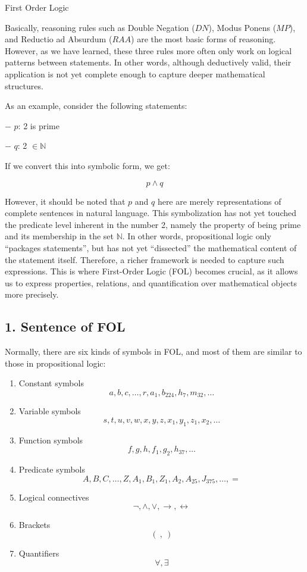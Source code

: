 First Order Logic

Basically, reasoning rules such as Double Negation (\(DN\)), Modus
Ponens (\(MP\)), and Reductio ad Absurdum (\(RAA\)) are the most basic
forms of reasoning. However, as we have learned, these three rules more
often only work on logical patterns between statements. In other words,
although deductively valid, their application is not yet complete enough
to capture deeper mathematical structures.

As an example, consider the following statements:

− \(p\): 2 is prime

− \(q\): 2 \(\in \mathbb{N}\)

If we convert this into symbolic form, we get:

\[p \land q\]

However, it should be noted that \(p\) and \(q\) here are merely
representations of complete sentences in natural language. This
symbolization has not yet touched the predicate level inherent in the
number 2, namely the property of being prime and its membership in the
set \(\mathbb{N}\). In other words, propositional logic only ``packages
statements'', but has not yet ``dissected'' the mathematical content of
the statement itself. Therefore, a richer framework is needed to capture
such expressions. This is where First-Order Logic (FOL) becomes crucial,
as it allows us to express properties, relations, and quantification
over mathematical objects more precisely.

\subsection{1. Sentence of FOL}\label{sentence-of-fol}

Normally, there are six kinds of symbols in FOL, and most of them are
similar to those in propositional logic:

\begin{enumerate}
\def\labelenumi{\arabic{enumi}.}
\item
  Constant symbols
  \[a, b, c, \dots, r, a_1, b_{224}, h_7, m_{32}, \dots\]
\item
  Variable symbols \[s, t, u, v, w, x, y, z, x_1, y_1, z_1, x_2, \dots\]
\item
  Function symbols \[f, g, h, f_1, g_2, h_{37}, \dots\]
\item
  Predicate symbols
  \[A, B, C, \dots, Z, A_1, B_1, Z_1, A_2, A_{25}, J_{375}, \dots, =\]
\item
  Logical connectives \[\lnot, \land, \lor, \to, \leftrightarrow\]
\item
  Brackets \[( \ , \ )\]
\item
  Quantifiers \[\forall, \exists\]
\end{enumerate}

